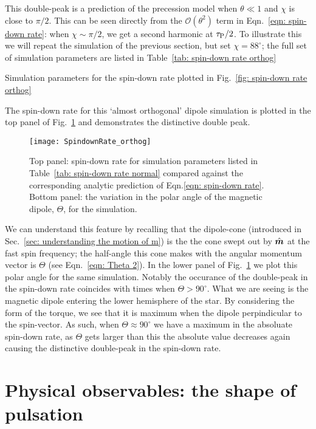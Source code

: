 \documentclass[../full_thesis/full_thesis.tex]{subfiles}
\begin{document}
This double-peak is a prediction of the precession model when $\theta \ll 1$
and $\chi$ is close to $\pi/2$. This can be seen directly from the
$\mathcal{O}(\theta^{2})$ term in Eqn.~\eqref{eqn: spin-down rate}: when $\chi
\sim \pi/2$, we get a second harmonic at $\tau_{\mathrm{P}}/2$. To illustrate this we will
repeat the simulation of the previous section, but set $\chi=88^{\circ}$; the
full set of simulation parameters are listed in Table~\ref{tab: spin-down rate
orthog}
\begin{table}[htb]
\centering

\caption{Simulation parameters for the spin-down rate plotted in Fig.~\ref{fig:
spin-down rate orthog}}
\label{tab: spin-down rate orthog}
\end{table}
The spin-down rate for this `almost orthogonal' dipole simulation is plotted
in the top panel of Fig.~\ref{fig: spin-down rate orthog} and demonstrates the
distinctive double peak.
\begin{figure}[htb]
\centering
\texttt{[image: SpindownRate\_orthog]}
\caption{Top panel: spin-down rate for simulation parameters listed in Table~\ref{tab:
spin-down rate normal} compared against the corresponding analytic prediction
of Eqn.\eqref{eqn: spin-down rate}. Bottom panel: the variation in the polar
angle of the magnetic dipole, $\Theta$, for the simulation.}
\label{fig: spin-down rate orthog}
\end{figure}
We can understand this feature by recalling that the dipole-cone (introduced in
Sec.~\ref{sec: understanding the motion of m}) is the
the cone swept out by $\hat{\boldsymbol{m}}$ at the fast spin frequency; the half-angle this cone
makes with the angular momentum vector is $\Theta$ (see Eqn.~\eqref{eqn: Theta 2}).
In the lower panel of Fig.~\ref{fig: spin-down rate orthog} we plot this polar
angle for the same simulation. Notably the occurance of the double-peak in the
spin-down rate coincides with times when $\Theta > 90^{\circ}$. What we are seeing
is the magnetic dipole entering the lower hemisphere of the star. By considering
the form of the \citet{Deutsch1955} torque, we see that it is maximum when
the dipole perpindicular to the spin-vector. As such, when $\Theta \approx 90^{\circ}$
we have a maximum in the absoluate spin-down rate, as $\Theta$ gets larger than
this the absolute value decreases again causing the distinctive double-peak
in the spin-down rate.


\section{Physical observables: the shape of pulsation}
\end{document}
